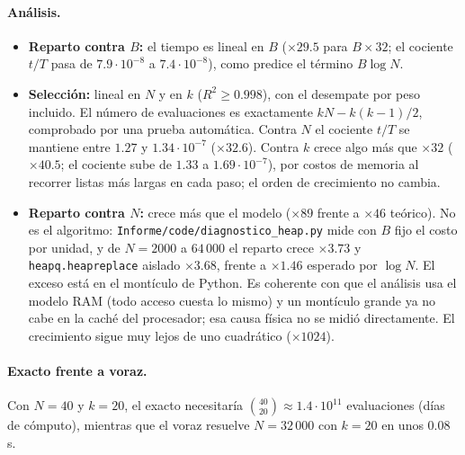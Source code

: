 \paragraph{Análisis.}
\begin{itemize}
  \item \textbf{Reparto contra $B$:} el tiempo es lineal en $B$ ($\times29.5$ para $B\times32$;
  el cociente $t/T$ pasa de $7.9\cdot10^{-8}$ a $7.4\cdot10^{-8}$), como predice el término $B\log N$.
  \item \textbf{Selección:} lineal en $N$ y en $k$ ($R^2\ge0.998$), con el desempate por peso
  incluido. El número de evaluaciones es exactamente $kN-k(k-1)/2$, comprobado por una prueba
  automática. Contra $N$ el cociente $t/T$ se mantiene entre $1.27$ y $1.34\cdot10^{-7}$
  ($\times32.6$). Contra $k$ crece algo más que $\times32$ ($\times40.5$; el cociente sube de
  $1.33$ a $1.69\cdot10^{-7}$), por costos de memoria al recorrer listas más largas en cada paso;
  el orden de crecimiento no cambia.
  \item \textbf{Reparto contra $N$:} crece más que el modelo ($\times89$ frente a $\times46$ teórico). No es
  el algoritmo: \texttt{Informe/code/diagnostico\_heap.py} mide con $B$ fijo el costo por unidad,
  y de $N=2000$ a $64\,000$ el reparto crece $\times3.73$ y \texttt{heapq.heapreplace} aislado
  $\times3.68$, frente a $\times1.46$ esperado por $\log N$. El exceso está en el montículo de
  Python. Es coherente con que el análisis usa el modelo RAM (todo acceso cuesta lo mismo) y un
  montículo grande ya no cabe en la caché del procesador; esa causa física no se midió
  directamente. El crecimiento sigue muy lejos de uno cuadrático ($\times1024$).
\end{itemize}

\paragraph{Exacto frente a voraz.} Con $N=40$ y $k=20$, el exacto necesitaría
$\binom{40}{20}\approx1.4\cdot10^{11}$ evaluaciones (días de cómputo), mientras que el voraz
resuelve $N=32\,000$ con $k=20$ en unos 0.08 s.
